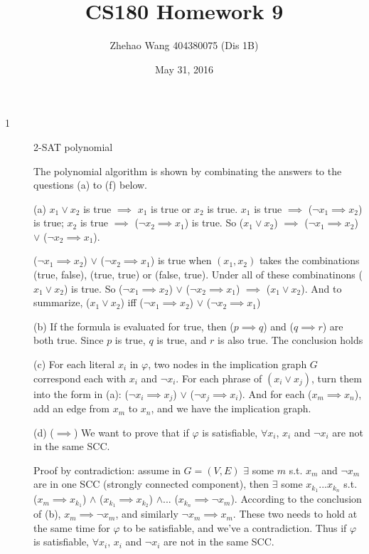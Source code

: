 \documentclass{article}
\title{CS180 Homework 9}
\author{Zhehao Wang 404380075 (Dis 1B)}
\date{May 31, 2016}
\begin{document}
\maketitle

\begin{description}

\item[1]{2-SAT polynomial}

  The polynomial algorithm is shown by combinating the answers to the questions (a) to (f) below.
  
  (a) $x_1 \vee x_2$ is true $\implies$ $x_1$ is true or $x_2$ is true. $x_1$ is true $\implies$ ($\neg x_1 \implies x_2$) is true; $x_2$ is true $\implies$ ($\neg x_2 \implies x_1$) is true. So ($x_1 \vee x_2$) $\implies$ ($\neg x_1 \implies x_2$) $\vee$ ($\neg x_2 \implies x_1$).

  ($\neg x_1 \implies x_2$) $\vee$ ($\neg x_2 \implies x_1$) is true when $(x_1, x_2)$ takes the combinations (true, false), (true, true) or (false, true). Under all of these combinatinons ($x_1 \vee x_2$) is true. So ($\neg x_1 \implies x_2$) $\vee$ ($\neg x_2 \implies x_1$) $\implies$ ($x_1 \vee x_2$). And to summarize, ($x_1 \vee x_2$) iff ($\neg x_1 \implies x_2$) $\vee$ ($\neg x_2 \implies x_1$)

  (b) If the formula is evaluated for true, then ($p \implies q$) and ($q \implies r$) are both true. Since $p$ is true, $q$ is true, and $r$ is also true. The conclusion holds

  (c) For each literal $x_i$ in $\varphi$, two nodes in the implication graph $G$ correspond each with $x_i$ and $\neg x_i$. For each phrase of $(x_i \vee x_j)$, turn them into the form in (a): ($\neg x_i \implies x_j$) $\vee$ ($\neg x_j \implies x_i$). And for each ($x_m \implies x_n$), add an edge from $x_m$ to $x_n$, and we have the implication graph.

  (d) ($\implies$) We want to prove that if $\varphi$ is satisfiable, $\forall x_i$, $x_i$ and $\neg x_i$ are not in the same SCC.

  Proof by contradiction: assume in $G = (V, E)$ $\exists$ some $m$ s.t. $x_m$ and $\neg x_m$ are in one SCC (strongly connected component), then $\exists$ some $x_{k_1}...x_{k_n}$ s.t. ($x_m \implies x_{k_1}$) $\wedge$ ($x_{k_1} \implies x_{k_2}$) $\wedge...$ ($x_{k_n} \implies \neg x_m$). According to the conclusion of (b), $x_m \implies \neg x_m$, and similarly $\neg x_m \implies x_m$. These two needs to hold at the same time for $\varphi$ to be satisfiable, and we've a contradiction. Thus if $\varphi$ is satisfiable, $\forall x_i$, $x_i$ and $\neg x_i$ are not in the same SCC.


\end{description}
\end{document}
